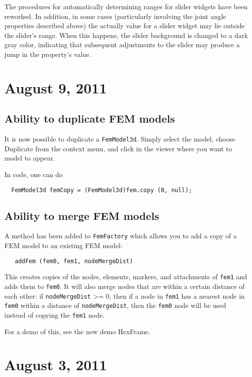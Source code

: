 \documentclass{article}
\begin{document}
The procedures for automatically determining ranges for slider widgets
have been reworked. In addition, in some cases (particularly involving
the joint angle properties described above) the actually value for a slider
widget may lie outside the slider's range. When this happens,
the slider background is changed to a dark gray color, indicating that
subsequent adjustments to the slider may produce a jump in the
property's value.

\section*{August 9, 2011}

\subsection*{Ability to duplicate FEM models}

It is now possible to duplicate a {\tt FemModel3d}. Simply select the
model, choose {\sf Duplicate} from the context menu, and click in
the viewer where you want to model to appear.

In code, one can do

\begin{verbatim}
  FemModel3d femCopy = (FemModel3d)fem.copy (0, null);
\end{verbatim}

\subsection*{Ability to merge FEM models}

A method has been added to {\tt FemFactory} which allows you to add a copy
of a FEM model to an existing FEM model:

\begin{verbatim}
   addFem (fem0, fem1, nodeMergeDist)
\end{verbatim}

This creates copies of the nodes, elements, markers, and attachments
of {\tt fem1} and adds them to {\tt fem0}. It will also merge nodes that are
within a certain distance of each other: if {\tt nodeMergeDist} >= 0, then
if a node in {\tt fem1} has a nearest node in {\tt fem0} within a distance of
{\tt nodeMergeDist}, then the {\tt fem0} node will be used instead of copying
the {\tt fem1} node.

For a demo of this, see the new demo {\sf HexFrame}.

\section*{August 3, 2011}
\end{document}
